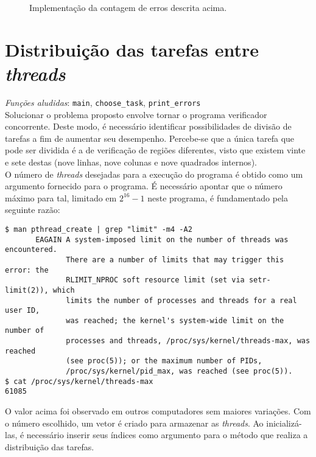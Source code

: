 \documentclass[12pt]{article}
\begin{document}
\begin{figure}[htbp]
  
  \caption{Implementação da contagem de erros descrita acima.}
\end{figure}

\section{Distribuição das tarefas entre \emph{threads}}

\emph{Funções aludidas}: \texttt{main}, \texttt{choose\_task},
\texttt{print\_errors} \\

Solucionar o problema proposto envolve tornar o programa verificador
concorrente. Deste modo, é necessário identificar possibilidades de divisão de
tarefas a fim de aumentar seu desempenho. Percebe-se que a única tarefa que
pode ser dividida é a de verificação de regiões diferentes, visto que existem
vinte e sete destas (nove linhas, nove colunas e nove quadrados internos). \\

O número de \emph{threads} desejadas para a execução do programa é obtido como
um argumento fornecido para o programa. É necessário apontar que o número
máximo para tal, limitado em $2^{16} - 1$ neste programa, é fundamentado pela
seguinte razão:

\begin{verbatim}
$ man pthread_create | grep "limit" -m4 -A2
       EAGAIN A system-imposed limit on the number of threads was encountered.
              There are a number of limits that may trigger this error: the
              RLIMIT_NPROC soft resource limit (set via setr‐limit(2)), which
              limits the number of processes and threads for a real user ID,
              was reached; the kernel's system-wide limit on the number of
              processes and threads, /proc/sys/kernel/threads-max, was reached
              (see proc(5)); or the maximum number of PIDs,
              /proc/sys/kernel/pid_max, was reached (see proc(5)).
$ cat /proc/sys/kernel/threads-max
61085
\end{verbatim}

O valor acima foi observado em outros computadores sem maiores variações. Com
o número escolhido, um vetor é criado para armazenar as \emph{threads}. Ao
inicializá-las, é necessário inserir seus índices como argumento para o método
que realiza a distribuição das tarefas. \\
\end{document}
